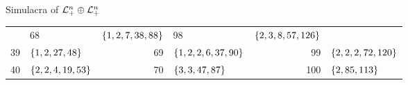 \documentclass{interact}
\theoremstyle{plain}
\theoremstyle{definition}
\theoremstyle{remark}
\begin{document}
\begin{section}{Simulacra of ${\mathcal{L}^{{n}}_{+}}\oplus{ \mathcal{L}^{{n}}_{+} }$}
\begin{table}[H]
\begin{center}
\begin{tabular}{rl  rl  rl}
            & 68 & $\left\lbrace{1, 2, 7, 38, 88}\right\rbrace$
            & 98 & $\left\lbrace{2, 3, 8, 57, 126}\right\rbrace$\\
          39 & $\left\lbrace{1, 2, 27, 48}\right\rbrace$
            & 69 & $\left\lbrace{1, 2, 2, 6, 37, 90}\right\rbrace$
            & 99 & $\left\lbrace{2, 2, 2, 72, 120}\right\rbrace$\\
          40 & $\left\lbrace{2, 2, 4, 19, 53}\right\rbrace$
            & 70 & $\left\lbrace{3, 3, 47, 87}\right\rbrace$
            & 100 & $\left\lbrace{2, 85, 113}\right\rbrace$\\
        \end{tabular}
        \end{center}
        \normalsize
    \end{table}
  \end{section}
\end{document}
